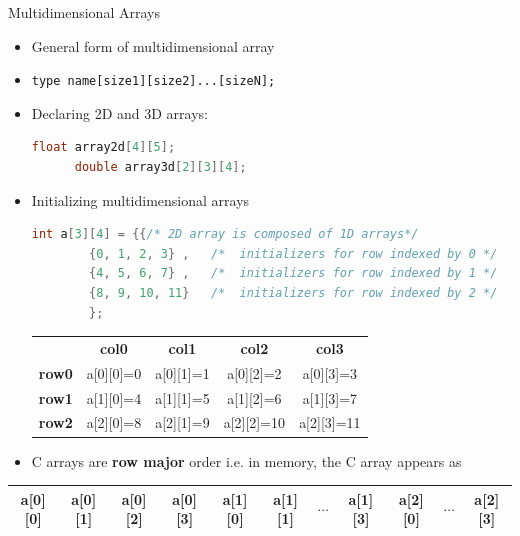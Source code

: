 \documentclass[10pt,t]{beamer}
\begin{document}
\begin{frame}[fragile]{Multidimensional Arrays}
  \begin{itemize}
  \item General form of multidimensional array
  \item[] \lstinline[basicstyle=\scriptsize\ttfamily]|type name[size1][size2]...[sizeN];|
  \item Declaring 2D and 3D arrays:
    \begin{lstlisting}[language=C,basicstyle=\scriptsize\ttfamily]
      float array2d[4][5];
      double array3d[2][3][4];
    \end{lstlisting}
  \item Initializing multidimensional arrays
    \begin{lstlisting}[language=C,basicstyle=\scriptsize\ttfamily]
      int a[3][4] = {{/* 2D array is composed of 1D arrays*/
        {0, 1, 2, 3} ,   /*  initializers for row indexed by 0 */
        {4, 5, 6, 7} ,   /*  initializers for row indexed by 1 */
        {8, 9, 10, 11}   /*  initializers for row indexed by 2 */
        };
    \end{lstlisting}
    \begin{center}
      \begin{tabular}{c|c|c|c|c|}
        \multicolumn{1}{c}{}& \multicolumn{1}{c}{\textbf{col0}} & \multicolumn{1}{c}{\textbf{col1}} & \multicolumn{1}{c}{\textbf{col2}} & \multicolumn{1}{c}{\textbf{col3}} \\
        \cline{2-5}
        \textbf{row0} & a[0][0]=0 & a[0][1]=1 & a[0][2]=2 & a[0][3]=3 \\
        \cline{2-5}
        \textbf{row1} & a[1][0]=4 & a[1][1]=5 & a[1][2]=6 & a[1][3]=7 \\
        \cline{2-5}
        \textbf{row2} & a[2][0]=8 & a[2][1]=9 & a[2][2]=10 & a[2][3]=11\\
        \cline{2-5}
      \end{tabular}
    \end{center}
  \item C arrays are \textbf{row major} order i.e. in memory, the C array appears as
  \end{itemize}
      {\scriptsize
        \begin{tabular}{|c|c|c|c|c|c|c|c|c|c|c|}
          \hline
          a[0][0] & a[0][1] & a[0][2] & a[0][3] & a[1][0] & a[1][1] & $\cdots$ & a[1][3] & a[2][0] & $\cdots$ & a[2][3]\\
          \hline
        \end{tabular}
      }
\end{frame}
\end{document}
